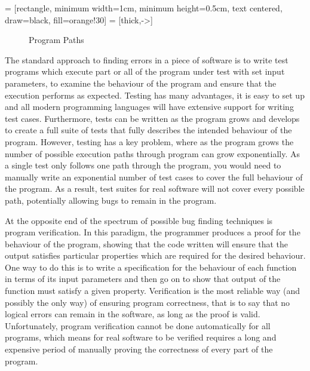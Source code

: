 \documentclass[12pt,twoside]{report}
\begin{document}
 = [rectangle, minimum width=1cm, minimum height=0.5cm, text centered, draw=black, fill=orange!30]
 = [thick,->]
\begin{figure}
    \centering
    \caption{Program Paths}
    \label{fig:enter-label}
\end{figure}

The standard approach to finding errors in a piece of software is to write test programs which execute part or all of the program under test with set input parameters, to examine the behaviour of the program and ensure that the execution performs as expected. Testing has many advantages, it is easy to set up and all modern programming languages will have extensive support for writing test cases. Furthermore, tests can be written as the program grows and develops to create a full suite of tests that fully describes the intended behaviour of the program. However, testing has a key problem, where as the program grows the number of possible execution paths through program can grow exponentially. As a single test only follows one path through the program, you would need to manually write an exponential number of test cases to cover the full behaviour of the program. As a result, test suites for real software will not cover every possible path, potentially allowing bugs to remain in the program.

At the opposite end of the spectrum of possible bug finding techniques is program verification. In this paradigm, the programmer produces a proof for the behaviour of the program, showing that the code written will ensure that the output satisfies particular properties which are required for the desired behaviour. One way to do this is to write a specification for the behaviour of each function in terms of its input parameters and then go on to show that output of the function must satisfy a given property. Verification is the most reliable way (and possibly the only way) of ensuring program correctness, that is to say that no logical errors can remain in the software, as long as the proof is valid. Unfortunately, program verification cannot be done automatically for all programs, which means for real software to be verified requires a long and expensive period of manually proving the correctness of every part of the program.
\end{document}
